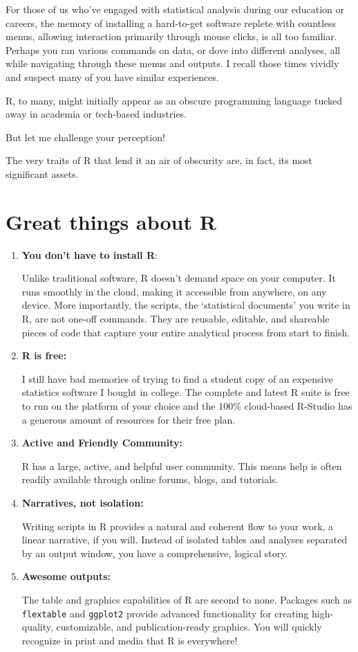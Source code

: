 \documentclass[
  letterpaper,
  DIV=11,
  numbers=noendperiod]{scrreprt}
\begin{document}
For those of us who've engaged with statistical analysis during our
education or careers, the memory of installing a hard-to-get software
replete with countless menus, allowing interaction primarily through
mouse clicks, is all too familiar. Perhaps you ran various commands on
data, or dove into different analyses, all while navigating through
these menus and outputs. I recall those times vividly and suspect many
of you have similar experiences.

R, to many, might initially appear as an obscure programming language
tucked away in academia or tech-based industries.

But let me challenge your perception!

The very traits of R that lend it an air of obscurity are, in fact, its
most significant assets.

\hypertarget{great-things-about-r}{%
\section{Great things about R}\label{great-things-about-r}}

\begin{enumerate}
\def\labelenumi{\arabic{enumi}.}
\item
  \textbf{You don't have to install R}:

  Unlike traditional software, R doesn't demand space on your computer.
  It runs smoothly in the cloud, making it accessible from anywhere, on
  any device. More importantly, the scripts, the `statistical documents'
  you write in R, are not one-off commands. They are reusable, editable,
  and shareable pieces of code that capture your entire analytical
  process from start to finish.
\item
  \textbf{R is free:}

  I still have bad memories of trying to find a student copy of an
  expensive statistics software I bought in college. The complete and
  latest R suite is free to run on the platform of your choice and the
  100\% cloud-based R-Studio has a generous amount of resources for
  their free plan.
\item
  \textbf{Active and Friendly Community:}

  R has a large, active, and helpful user community. This means help is
  often readily available through online forums, blogs, and tutorials.
\item
  \textbf{Narratives, not isolation:}

  Writing scripts in R provides a natural and coherent flow to your
  work, a linear narrative, if you will. Instead of isolated tables and
  analyses separated by an output window, you have a comprehensive,
  logical story.
\item
  \textbf{Awesome outputs:}

  The table and graphics capabilities of R are second to none. Packages
  such as \texttt{flextable} and \texttt{ggplot2} provide advanced
  functionality for creating high-quality, customizable, and
  publication-ready graphics. You will quickly recognize in print and
  media that R is everywhere!
\end{enumerate}
\end{document}
